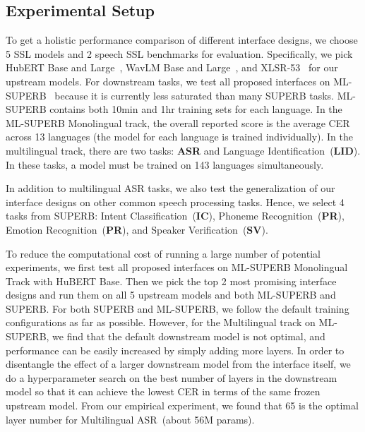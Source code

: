 



\subsection{Experimental Setup}

To get a holistic performance comparison of different interface designs, we choose 5 SSL models and 2 speech SSL benchmarks for evaluation.
Specifically, we pick HubERT Base and Large~\cite{hsu2021hubert}, WavLM Base and Large~\cite{Chen2021WavLMLS}, and XLSR-53~\cite{Conneau2020xlsr} for our upstream models.
For downstream tasks, we test all proposed interfaces on ML-SUPERB~\cite{shi23g_mlsuperb} because it is currently less saturated than many SUPERB tasks.
ML-SUPERB contains both 10min and 1hr training sets for each language.
In the ML-SUPERB Monolingual track, the overall reported score is the average CER across 13 languages (the model for each language is trained individually).
In the multilingual track, there are two tasks: \textbf{ASR} and Language Identification~(\textbf{LID}).
In these tasks, a model must be trained on 143 languages simultaneously.

In addition to multilingual ASR tasks, we also test the generalization of our interface designs on other common speech processing tasks.
Hence, we select 4 tasks from  SUPERB: Intent Classification~(\textbf{IC}), Phoneme Recognition~(\textbf{PR}), Emotion Recognition~(\textbf{PR}), and Speaker Verification~(\textbf{SV}).

To reduce the computational cost of running a large number of potential experiments, we first test all proposed interfaces on ML-SUPERB Monolingual Track with HuBERT Base.
Then we pick the top 2 most promising interface designs and run them on all 5 upstream models and both ML-SUPERB and SUPERB.
For both SUPERB and ML-SUPERB, we follow the default training configurations as far as possible.
However, for the Multilingual track on ML-SUPERB, we find that the default downstream model
is not optimal, and performance can be easily increased by simply adding more layers.
In order to disentangle the effect of a larger downstream model from the interface itself, we do a hyperparameter search on the best number of layers in the downstream model so that it can achieve the lowest CER in terms of the same frozen upstream model.
From our empirical experiment, we found that 65 is the optimal layer number for Multilingual ASR~(about 56M params).


